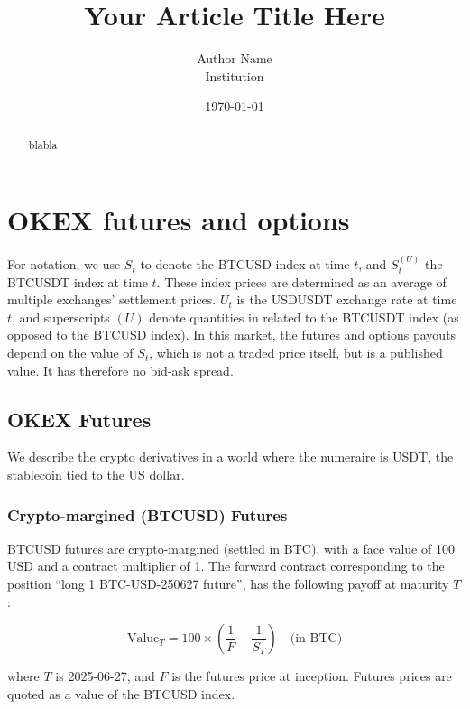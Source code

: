 \documentclass[12pt]{article}
\title{Your Article Title Here}
\author{Author Name \\ Institution}
\date{\today}
\begin{document}
\maketitle

\begin{abstract}
blabla
\end{abstract}

\section{OKEX futures and options}

For notation, we use $S_t$ to denote the BTCUSD index at time $t$, and $S^{(U)}_t$ the BTCUSDT index at time $t$. These index prices are determined as an average of multiple exchanges' settlement prices. $U_t$ is the USDUSDT exchange rate at time $t$, and superscripts $(U)$ denote quantities in related to the BTCUSDT index (as opposed to the BTCUSD index). In this market, the futures and options payouts depend on the value of $S_t$, which is not a traded price itself, but is a published value. It has therefore no bid-ask spread.

\subsection{OKEX Futures}

We describe the crypto derivatives in a world where the numeraire is USDT, the stablecoin tied to the US dollar.

\subsubsection{Crypto-margined (BTCUSD) Futures}

BTCUSD futures are crypto-margined (settled in BTC), with a face value of 100 USD and a contract multiplier of 1. The forward contract corresponding to the position ``long 1 BTC-USD-250627 future'', has the following payoff at maturity $T$:

\begin{equation}
\text{Value}_T = 100\times(\frac{1}{F} - \frac{1}{S_T})   \quad\text{(in BTC)}
\end{equation}

where $T$ is 2025-06-27, and $F$ is the futures price at inception. Futures prices are quoted as a value of the BTCUSD index.
\end{document}
